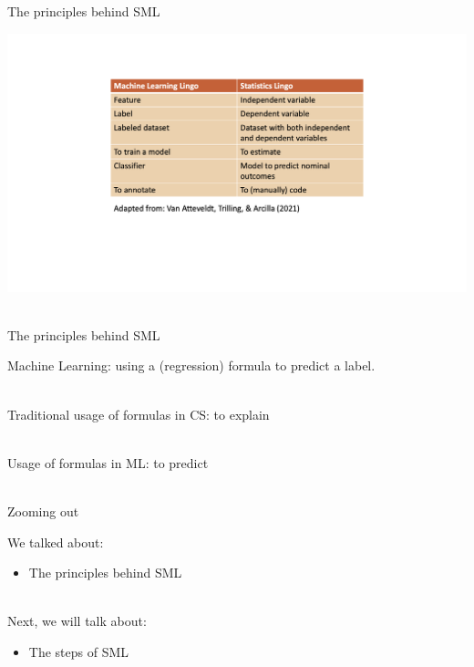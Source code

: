 \documentclass[handout]{beamer}
\begin{document}
\begin{frame}{The principles behind SML}
	
	\begin{center}
		\includegraphics[width=\linewidth,height=\textheight,keepaspectratio]{../pictures/MLlingo.png} \\\
	\end{center}
	
	
	
\end{frame}


\begin{frame}{The principles behind SML} 
	
	Machine Learning: using a (regression) formula to predict a label. \\\
	
	Traditional usage of formulas in CS: to explain \\\
	
	Usage of formulas in ML: to predict \\\

	
	
	
\end{frame}



\begin{frame}{Zooming out} 
	
	We talked about:
	\begin{itemize}
		\item The principles behind SML \\\
	\end{itemize}

	Next, we will talk about:
	\begin{itemize}
		\item The steps of SML
	\end{itemize}
	
\end{frame}
\end{document}
